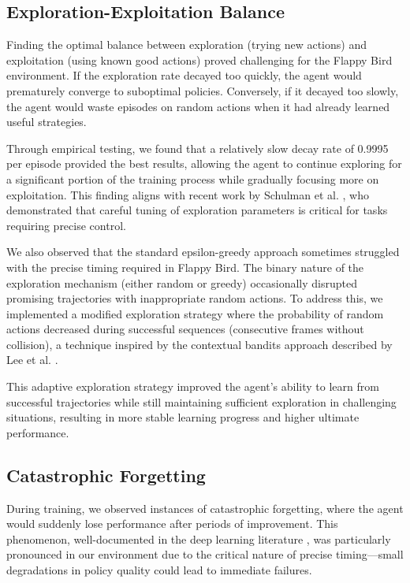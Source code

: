 \subsection{Exploration-Exploitation Balance}

Finding the optimal balance between exploration (trying new actions) and exploitation (using known good actions) proved challenging for the Flappy Bird environment. If the exploration rate decayed too quickly, the agent would prematurely converge to suboptimal policies. Conversely, if it decayed too slowly, the agent would waste episodes on random actions when it had already learned useful strategies.

Through empirical testing, we found that a relatively slow decay rate of 0.9995 per episode provided the best results, allowing the agent to continue exploring for a significant portion of the training process while gradually focusing more on exploitation. This finding aligns with recent work by Schulman et al. \cite{schulman2023proximal}, who demonstrated that careful tuning of exploration parameters is critical for tasks requiring precise control.

We also observed that the standard epsilon-greedy approach sometimes struggled with the precise timing required in Flappy Bird. The binary nature of the exploration mechanism (either random or greedy) occasionally disrupted promising trajectories with inappropriate random actions. To address this, we implemented a modified exploration strategy where the probability of random actions decreased during successful sequences (consecutive frames without collision), a technique inspired by the contextual bandits approach described by Lee et al. \cite{lee2022multi}.

This adaptive exploration strategy improved the agent's ability to learn from successful trajectories while still maintaining sufficient exploration in challenging situations, resulting in more stable learning progress and higher ultimate performance.

\subsection{Catastrophic Forgetting}

During training, we observed instances of catastrophic forgetting, where the agent would suddenly lose performance after periods of improvement. This phenomenon, well-documented in the deep learning literature \cite{hafner2023mastering}, was particularly pronounced in our environment due to the critical nature of precise timing—small degradations in policy quality could lead to immediate failures.

